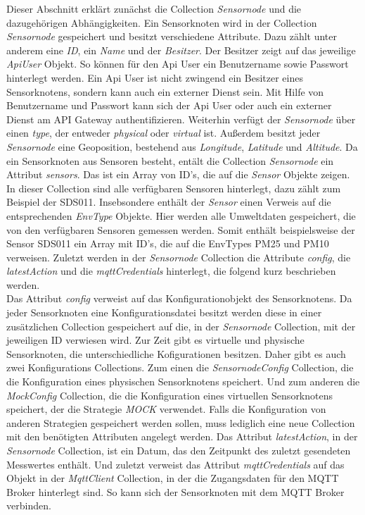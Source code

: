 Dieser Abschnitt erklärt zunächst die Collection \textit{Sensornode} und die dazugehörigen Abhängigkeiten. 
Ein Sensorknoten wird in der Collection \textit{Sensornode} gespeichert und besitzt verschiedene Attribute. 
Dazu zählt unter anderem eine \textit{ID}, ein \textit{Name} und der \textit{Besitzer}. 
Der Besitzer zeigt auf das jeweilige \textit{ApiUser} Objekt. 
So können für den Api User ein Benutzername sowie Passwort hinterlegt werden. 
Ein Api User ist nicht zwingend ein Besitzer eines Sensorknotens, sondern kann auch ein externer Dienst sein. 
Mit Hilfe von Benutzername und Passwort kann sich der Api User oder auch ein externer Dienst am API Gateway authentifizieren. 
Weiterhin verfügt der \textit{Sensornode} über einen \textit{type}, der entweder \textit{physical} oder \textit{virtual} ist. 
Außerdem besitzt jeder \textit{Sensornode} eine Geoposition, bestehend aus \textit{Longitude}, \textit{Latitude} und \textit{Altitude}. 
Da ein Sensorknoten aus Sensoren besteht, entält die Collection \textit{Sensornode} ein Attribut \textit{sensors}. Das ist ein Array von ID's, die auf die \textit{Sensor} Objekte zeigen. 
In dieser Collection sind alle verfügbaren Sensoren hinterlegt, dazu zählt zum Beispiel der SDS011. 
Insebsondere enthält der \textit{Sensor} einen Verweis auf die entsprechenden \textit{EnvType} Objekte. 
Hier werden alle Umweltdaten gespeichert, die von den verfügbaren Sensoren gemessen werden. 
Somit enthält beispielsweise der Sensor SDS011 ein Array mit ID's, die auf die EnvTypes PM25 und PM10 verweisen. 
Zuletzt werden in der \textit{Sensornode} Collection die Attribute \textit{config}, die \textit{latestAction} und die \textit{mqttCredentials} hinterlegt, die folgend kurz beschrieben werden. \\
Das Attribut \textit{config} verweist auf das Konfigurationobjekt des Sensorknotens. 
Da jeder Sensorknoten eine Konfigurationsdatei besitzt werden diese in einer zusätzlichen Collection gespeichert auf die, in der \textit{Sensornode} Collection, mit der jeweiligen ID verwiesen wird. 
Zur Zeit gibt es virtuelle und physische Sensorknoten, die unterschiedliche Kofigurationen besitzen. 
Daher gibt es auch zwei Konfigurations Collections. 
Zum einen die \textit{SensornodeConfig} Collection, die die Konfiguration eines physischen Sensorknotens speichert. 
Und zum anderen die \textit{MockConfig} Collection, die die Konfiguration eines virtuellen Sensorknotens speichert, der die Strategie \textit{MOCK} verwendet. 
Falls die Konfiguration von anderen Strategien gespeichert werden sollen, muss lediglich eine neue Collection mit den benötigten Attributen angelegt werden. 
Das Attribut \textit{latestAction}, in der \textit{Sensornode} Collection, ist ein Datum, das den Zeitpunkt des zuletzt gesendeten Messwertes enthält. 
Und zuletzt verweist das Attribut \textit{mqttCredentials} auf das Objekt in der \textit{MqttClient} Collection, in der die Zugangsdaten für den MQTT Broker hinterlegt sind. 
So kann sich der Sensorknoten mit dem MQTT Broker verbinden. 

